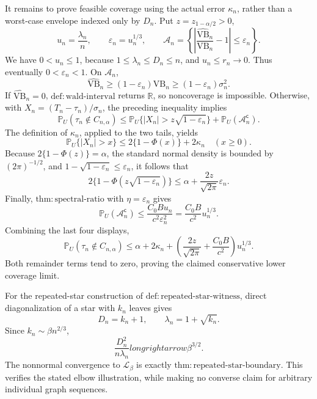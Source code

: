 It remains to prove feasible coverage using the actual error \(\kappa_n\), rather than a worst-case envelope indexed only by \(D_n\).  Put \(z=z_{1-\alpha/2}>0\),
\[
 u_n=\frac{\lambda_n}{n},
 \qquad
 \varepsilon_n=u_n^{1/3},
 \qquad
 \mathcal A_n=\left\{
 \left|\frac{\widehat{\mathrm{VB}}_n}{\mathrm{VB}_n}-1\right|
 \le\varepsilon_n\right\}.
\]
We have \(0<u_n\le1\), because \(1\le\lambda_n\le D_n\le n\), and \(u_n\le r_n\to0\).  Thus eventually \(0<\varepsilon_n<1\).  On \(\mathcal A_n\),
\[
 \widehat{\mathrm{VB}}_n
 \ge(1-\varepsilon_n)\mathrm{VB}_n
 \ge(1-\varepsilon_n)\sigma_n^2.
\]
If \(\widehat{\mathrm{VB}}_n=0\), \(\mathrm{def:wald\text{-}interval}\) returns \(\mathbb R\), so noncoverage is impossible.  Otherwise, with \(X_n=(T_n-\tau_n)/\sigma_n\), the preceding inequality implies
\[
 \mathbb P_U(\tau_n\notin C_{n,\alpha})
 \le \mathbb P_U\{|X_n|>z\sqrt{1-\varepsilon_n}\}
 +\mathbb P_U(\mathcal A_n^{\mathsf c}).
\]
The definition of \(\kappa_n\), applied to the two tails, yields
\[
 \mathbb P_U\{|X_n|>x\}\le2\{1-\Phi(x)\}+2\kappa_n
 \quad(x\ge0).
\]
Because \(2\{1-\Phi(z)\}=\alpha\), the standard normal density is bounded by \((2\pi)^{-1/2}\), and \(1-\sqrt{1-\varepsilon_n}\le\varepsilon_n\), it follows that
\[
 2\{1-\Phi(z\sqrt{1-\varepsilon_n})\}
 \le\alpha+\frac{2z}{\sqrt{2\pi}}\varepsilon_n.
\]
Finally, \(\mathrm{thm:spectral\text{-}ratio}\) with \(\eta=\varepsilon_n\) gives
\[
 \mathbb P_U(\mathcal A_n^{\mathsf c})
 \le\frac{C_0B u_n}{c^2\varepsilon_n^2}
 =\frac{C_0B}{c^2}u_n^{1/3}.
\]
Combining the last four displays,
\[
 \mathbb P_U(\tau_n\notin C_{n,\alpha})
 \le\alpha+2\kappa_n+
 \left(\frac{2z}{\sqrt{2\pi}}+\frac{C_0B}{c^2}\right)u_n^{1/3}.
\]
Both remainder terms tend to zero, proving the claimed conservative lower coverage limit.

For the repeated-star construction of \(\mathrm{def:repeated\text{-}star\text{-}witness}\), direct diagonalization of a star with \(k_n\) leaves gives
\[
 D_n=k_n+1,
 \qquad
 \lambda_n=1+\sqrt{k_n}.
\]
Since \(k_n\sim\beta n^{2/3}\),
\[
 \frac{D_n^2}{n\lambda_n}longrightarrow\beta^{3/2}.
\]
The nonnormal convergence to \(\mathcal L_\beta\) is exactly \(\mathrm{thm:repeated\text{-}star\text{-}boundary}\).  This verifies the stated elbow illustration, while making no converse claim for arbitrary individual graph sequences.

